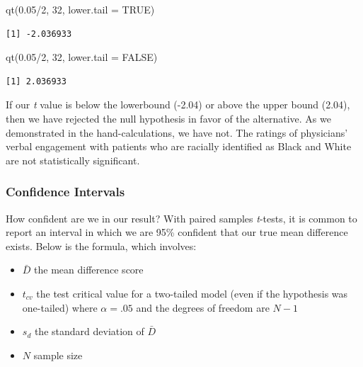 \documentclass[
  11pt,
]{book}
\newenvironment{Shaded}{\begin{snugshade}}{\end{snugshade}}
\newcommand{\AttributeTok}[1]{\textcolor[rgb]{0.77,0.63,0.00}{#1}}
\newcommand{\ConstantTok}[1]{\textcolor[rgb]{0.00,0.00,0.00}{#1}}
\newcommand{\DecValTok}[1]{\textcolor[rgb]{0.00,0.00,0.81}{#1}}
\newcommand{\FloatTok}[1]{\textcolor[rgb]{0.00,0.00,0.81}{#1}}
\newcommand{\FunctionTok}[1]{\textcolor[rgb]{0.00,0.00,0.00}{#1}}
\newcommand{\NormalTok}[1]{#1}
\newcommand{\SpecialCharTok}[1]{\textcolor[rgb]{0.00,0.00,0.00}{#1}}
\providecommand{\tightlist}{%
  \setlength{\itemsep}{0pt}\setlength{\parskip}{0pt}}
\begin{document}
\begin{Shaded}
\begin{Highlighting}[]
\FunctionTok{qt}\NormalTok{(}\FloatTok{0.05}\SpecialCharTok{/}\DecValTok{2}\NormalTok{, }\DecValTok{32}\NormalTok{, }\AttributeTok{lower.tail =} \ConstantTok{TRUE}\NormalTok{)}
\end{Highlighting}
\end{Shaded}

\begin{verbatim}
[1] -2.036933
\end{verbatim}

\begin{Shaded}
\begin{Highlighting}[]
\FunctionTok{qt}\NormalTok{(}\FloatTok{0.05}\SpecialCharTok{/}\DecValTok{2}\NormalTok{, }\DecValTok{32}\NormalTok{, }\AttributeTok{lower.tail =} \ConstantTok{FALSE}\NormalTok{)}
\end{Highlighting}
\end{Shaded}

\begin{verbatim}
[1] 2.036933
\end{verbatim}

If our \emph{t} value is below the lowerbound (-2.04) or above the upper bound (2.04), then we have rejected the null hypothesis in favor of the alternative. As we demonstrated in the hand-calculations, we have not. The ratings of physicians' verbal engagement with patients who are racially identified as Black and White are not statistically significant.

\hypertarget{confidence-intervals-2}{%
\subsubsection{Confidence Intervals}\label{confidence-intervals-2}}

How confident are we in our result? With paired samples \emph{t}-tests, it is common to report an interval in which we are 95\% confident that our true mean difference exists. Below is the formula, which involves:

\begin{itemize}
\tightlist
\item
  \(\bar{D}\) the mean difference score
\item
  \(t_{cv}\) the test critical value for a two-tailed model (even if the hypothesis was one-tailed) where \(\alpha = .05\) and the degrees of freedom are \(N-1\)
\item
  \(s_{d}\) the standard deviation of \(\bar{D}\)
\item
  \(N\) sample size
\end{itemize}
\end{document}
